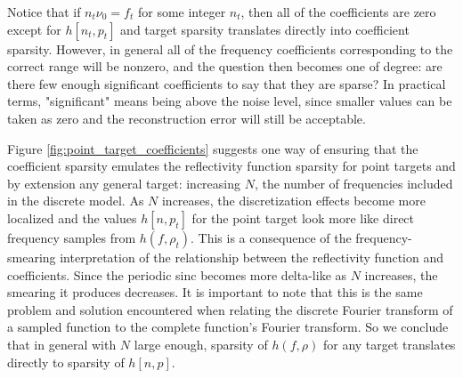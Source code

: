 Notice that if $n_t\nu_0 = f_t$ for some integer $n_t$, then all of the coefficients are zero except for $h[n_t,p_t]$ and target sparsity translates directly into coefficient sparsity. However, in general all of the frequency coefficients corresponding to the correct range will be nonzero, and the question then becomes one of degree: are there few enough significant coefficients to say that they are sparse? In practical terms, "significant" means being above the noise level, since smaller values can be taken as zero and the reconstruction error will still be acceptable.

Figure \ref{fig:point_target_coefficients} suggests one way of ensuring that the coefficient sparsity emulates the reflectivity function sparsity for point targets and by extension any general target: increasing $N$, the number of frequencies included in the discrete model. As $N$ increases, the discretization effects become more localized and the values $h[n,p_t]$ for the point target look more like direct frequency samples from $h(f, \rho_t)$. This is a consequence of the frequency-smearing interpretation of the relationship between the reflectivity function and coefficients. Since the periodic sinc becomes more delta-like as $N$ increases, the smearing it produces decreases. It is important to note that this is the same problem and solution encountered when relating the discrete Fourier transform of a sampled function to the complete function's Fourier transform. So we conclude that in general with $N$ large enough, sparsity of $h(f, \rho)$ for any target translates directly to sparsity of $h[n,p]$.